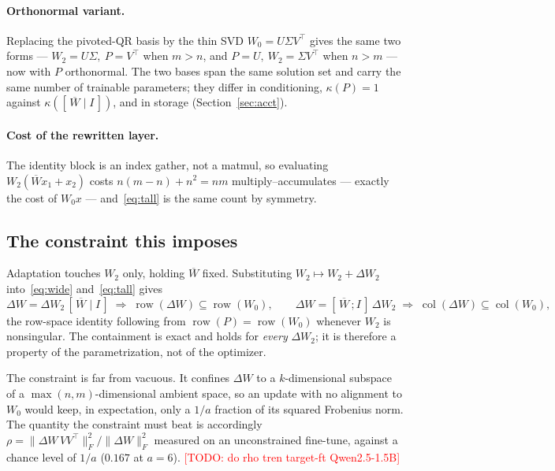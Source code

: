 \documentclass{article}
\newcommand{\TODO}[1]{\textcolor{red}{[TODO: #1]}}
\begin{document}
\paragraph{Orthonormal variant.}
Replacing the pivoted-QR basis by the thin SVD $W_0=U\Sigma V^{\top}$ gives the
same two forms --- $W_2=U\Sigma,\ P=V^{\top}$ when $m>n$, and
$P=U,\ W_2=\Sigma V^{\top}$ when $n>m$ --- now with $P$ orthonormal. The two
bases span the same solution set and carry the same number of trainable
parameters; they differ in conditioning, $\kappa(P)=1$ against
$\kappa([\,\overline{W}\mid I\,])$, and in storage
(Section~\ref{sec:acct}).

\paragraph{Cost of the rewritten layer.}
The identity block is an index gather, not a matmul, so evaluating
$W_2(\overline{W}x_1+x_2)$ costs $n(m-n)+n^2=nm$ multiply--accumulates ---
exactly the cost of $W_0x$ --- and~\eqref{eq:tall} is the same count by
symmetry.

\subsection{The constraint this imposes}
Adaptation touches $W_2$ only, holding $\overline{W}$ fixed. Substituting
$W_2\mapsto W_2+\Delta W_2$ into~\eqref{eq:wide} and~\eqref{eq:tall} gives
\begin{equation}
  \Delta W=\Delta W_2\,[\,\overline{W}\mid I\,]
  \;\Longrightarrow\;
  \operatorname{row}(\Delta W)\subseteq\operatorname{row}(W_0),
  \qquad
  \Delta W=[\,\overline{W}\,;I\,]\,\Delta W_2
  \;\Longrightarrow\;
  \operatorname{col}(\Delta W)\subseteq\operatorname{col}(W_0),
  \label{eq:constraint}
\end{equation}
the row-space identity following from
$\operatorname{row}(P)=\operatorname{row}(W_0)$ whenever $W_2$ is nonsingular.
The containment is exact and holds for \emph{every} $\Delta W_2$; it is
therefore a property of the parametrization, not of the optimizer.

The constraint is far from vacuous. It confines $\Delta W$ to a $k$-dimensional
subspace of a $\max(n,m)$-dimensional ambient space, so an update with no
alignment to $W_0$ would keep, in expectation, only a $1/a$ fraction of its
squared Frobenius norm. The quantity the constraint must beat is accordingly
$\rho=\|\Delta W\,VV^{\top}\|_F^2/\|\Delta W\|_F^2$ measured on an unconstrained
fine-tune, against a chance level of $1/a$ ($0.167$ at $a=6$).
\TODO{do rho tren target-ft Qwen2.5-1.5B}
\end{document}
